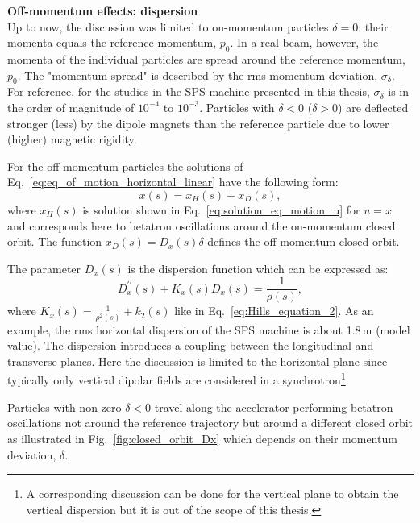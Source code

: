 \textbf{Off-momentum effects: dispersion}\\
Up to now, the discussion was limited to on-momentum particles $\delta=0$: their momenta equals the reference momentum, $p_0$. In a real beam, however, the momenta of the individual particles are spread around the reference momentum, $p_0$. The "momentum spread" is described by the rms momentum deviation, $\sigma_\delta$. For reference, for the studies in the SPS machine presented in this thesis, $\sigma_\delta$ is in the order of magnitude of $10^{-4}$ to $10^{-3}$. Particles with $\delta < 0$ ($\delta>0$) are deflected stronger (less) by the dipole magnets than the reference particle due to lower (higher) magnetic rigidity.

For the off-momentum particles the solutions of Eq.~\eqref{eq:eq_of_motion_horizontal_linear} have the following form:
\begin{equation}
    x(s) = x_H(s) + x_D(s),
\end{equation}
where $x_H(s)$ is solution shown in Eq.~\eqref{eq:solution_eq_motion_u} for $u=x$ and corresponds here to betatron oscillations around the on-momentum closed orbit. %
The function $x_D(s)=D_x(s) \delta$ defines the off-momentum closed orbit. 

The parameter $D_x(s)$ is the dispersion function which can be expressed as:
\begin{equation}\label{eq:dispersion_function}
    D^{\prime \prime}_x(s) + K_x(s)D_x(s) = \frac{1}{\rho(s)},
\end{equation}
where $K_x(s)= \frac{1}{\rho^2(s)}+k_2(s)$ like in Eq.~\eqref{eq:Hills_equation_2}. As an example, the rms horizontal dispersion of the SPS machine is about 1.8\,m (model value). The dispersion introduces a coupling between the longitudinal and transverse planes. Here the discussion is limited to the horizontal plane since typically only vertical dipolar fields are considered in a synchrotron\footnote{A corresponding discussion can be done for the vertical plane to obtain the vertical dispersion but it is out of the scope of this thesis.}.

Particles with non-zero $\delta < 0$ travel along the accelerator performing betatron oscillations not around the reference trajectory but around a different closed orbit as illustrated in Fig.~\ref{fig:closed_orbit_Dx} which depends on their momentum deviation, $\delta$. 



